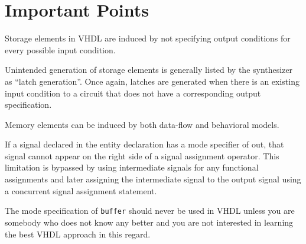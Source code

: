 \section{Important Points}
\begin{my_list}
\item Storage elements in VHDL are induced by not specifying output conditions for every possible input condition.

\item Unintended generation of storage elements is generally listed by the synthesizer as ``latch generation''. Once again, latches are generated when there is an existing input condition to a circuit that does not have a corresponding output specification.

\item Memory elements can be induced by both data-flow and behavioral models.

\item If a signal declared in the entity declaration has a mode specifier of out, that signal cannot appear on the right side of a signal assignment operator. This limitation is bypassed by using intermediate signals for any functional assignments and later assigning the intermediate signal to the output signal using a concurrent signal assignment statement.

\item The mode specification of \texttt{buffer} should never be used in VHDL unless you are somebody who does not know any better and you are not interested in learning the best VHDL approach in this regard.
\end{my_list}

